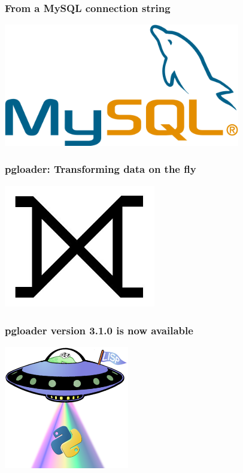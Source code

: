 \documentclass{beamer}
\begin{document}
\begin{frame}
  \frametitle{From a MySQL connection string}


  \begin{center}
    \includegraphics[height=2.1in]{mysql.png}
  \end{center}
\end{frame}

\begin{frame}
  \frametitle{pgloader: Transforming data on the fly}


  \begin{center}
    \includegraphics[height=2.1in]{huge-full-outer-join.jpg}
  \end{center}
\end{frame}

\begin{frame}
  \frametitle{pgloader version 3.1.0 is now available}

  \begin{center}
    \includegraphics[height=2.1in]{lisp-python.png}
  \end{center}

\end{frame}
\end{document}
